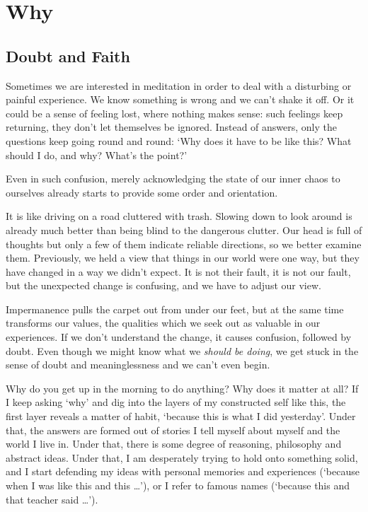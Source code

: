 \chapter{Why}

\section{Doubt and Faith}


\noindent Sometimes we are interested in meditation in order to deal
with a disturbing or painful experience. We know something is wrong and
we can't shake it off. Or it could be a sense of feeling lost, where
nothing makes sense: such feelings keep returning, they don't let
themselves be ignored. Instead of answers, only the questions keep going
round and round: `Why does it have to be like this? What should I do,
and why? What's the point?'

Even in such confusion, merely acknowledging the state of our inner
chaos to ourselves already starts to provide some order and orientation.

\enlargethispage*{\baselineskip}

It is like driving on a road cluttered with trash. Slowing down to look
around is already much better than being blind to the dangerous clutter.
Our head is full of thoughts but only a few of them indicate reliable
directions, so we better examine them. Previously, we held a view that
things in our world were one way, but they have changed in a way we
didn't expect. It is not their fault, it is not our fault, but the
unexpected change is confusing, and we have to adjust our view.

Impermanence pulls the carpet out from under our feet, but at the same
time transforms our values, the qualities which we seek out as valuable
in our experiences. If we don't understand the change, it causes
confusion, followed by doubt. Even though we might know what we
\emph{should be doing}, we get stuck in the sense of doubt and
meaninglessness and we can't even begin.


Why do you get up in the morning to do anything? Why does it matter at
all? If I keep asking `why' and dig into the layers of my constructed
self like this, the first layer reveals a matter of habit, `because this
is what I did yesterday'. Under that, the answers are formed out of
stories I tell myself about myself and the world I live in. Under that,
there is some degree of reasoning, philosophy and abstract ideas. Under
that, I am desperately trying to hold onto something solid, and I start
defending my ideas with personal memories and experiences (`because when
I was like this and this \ldots{}'), or I refer to famous names
(`because this and that teacher said \ldots{}').

